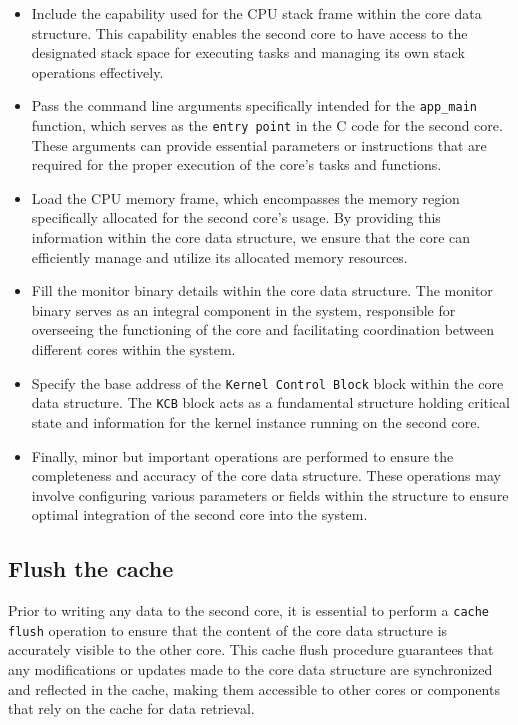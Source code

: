 \begin{itemize}
    \item Include the capability used for the CPU stack frame within the core data structure. This capability enables the second core to have access to the designated stack space for executing tasks and managing its own stack operations effectively.

    \item Pass the command line arguments specifically intended for the \texttt{app\_main} function, which serves as the \texttt{entry point} in the C code for the second core. These arguments can provide essential parameters or instructions that are required for the proper execution of the core's tasks and functions.

    \item Load the CPU memory frame, which encompasses the memory region specifically allocated for the second core's usage. By providing this information within the core data structure, we ensure that the core can efficiently manage and utilize its allocated memory resources.

    \item Fill the monitor binary details within the core data structure. The monitor binary serves as an integral component in the system, responsible for overseeing the functioning of the core and facilitating coordination between different cores within the system.

    \item Specify the base address of the \texttt{Kernel Control Block} block within the core data structure. The \texttt{KCB} block acts as a fundamental structure holding critical state and information for the kernel instance running on the second core.

    \item Finally, minor but important operations are performed to ensure the completeness and accuracy of the core data structure. These operations may involve configuring various parameters or fields within the structure to ensure optimal integration of the second core into the system.
    
\end{itemize}

\subsection{Flush the cache}

Prior to writing any data to the second core, it is essential to perform a \texttt{cache flush} operation to ensure that the content of the core data structure is accurately visible to the other core. This cache flush procedure guarantees that any modifications or updates made to the core data structure are synchronized and reflected in the cache, making them accessible to other cores or components that rely on the cache for data retrieval.

